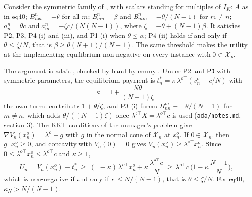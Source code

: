 \documentclass{article}
\begin{document}
\begin{claim}
Consider the symmetric family of , with scalars standing for multiples of \(I_K\): \(A\) as in eq40; \(B^n_{nm}=-\theta\) for all \(m\); \(B^n_{mn}=\beta\) and \(B^n_{mm}=-\theta/(N-1)\) for \(m\ne n\); \(a^n_n=\theta c\) and \(a^n_m=-\zeta c/(N(N-1))\), where \(\zeta=-\theta+(N-1)\beta\). It satisfies P2, P3, P4 (i) and (iii), and P1 (i) when \(\theta\le\alpha\); P4 (ii) holds if and only if \(\theta\le\zeta/N\), that is \(\beta\ge\theta(N+1)/(N-1)\). The same threshold makes the utility at the implementing equilibrium non-negative on every instance with \(0\in\mathcal{X}_n\). 
\end{claim}

The argument is ada's , checked by hand by emmy . Under P2 and P3 with symmetric parameters, the equilibrium payment is \(t^*_n=\kappa\,\lambda^{o\top}(x^o_n-c/N)\) with
\[
\kappa=1+\frac{N\theta}{(N-1)\zeta}:
\]
the own terms contribute \(1+\theta/\zeta\), and P3 (i) forces \(B^m_{nn}=-\theta/(N-1)\) for \(m\ne n\), which adds \(\theta/((N-1)\zeta)\) once \(\lambda^{o\top}X=\lambda^{o\top}c\) is used (\texttt{ada/notes.md}, section 3). The KKT conditions of the manager's problem give \(\nabla V_n(x^o_n)=\lambda^o+g\) with \(g\) in the normal cone of \(\mathcal{X}_n\) at \(x^o_n\). If \(0\in\mathcal{X}_n\), then \(g^\top x^o_n\ge0\), and concavity with \(V_n(0)=0\) gives \(V_n(x^o_n)\ge\lambda^{o\top}x^o_n\). Since \(0\le\lambda^{o\top}x^o_n\le\lambda^{o\top}c\) and \(\kappa\ge1\),
\[
U_n=V_n(x^o_n)-t^*_n\ \ge\ (1-\kappa)\,\lambda^{o\top}x^o_n+\kappa\,\frac{\lambda^{o\top}c}{N}\ \ge\ \lambda^{o\top}c\,\Big(1-\kappa\,\frac{N-1}{N}\Big),
\]
which is non-negative if and only if \(\kappa\le N/(N-1)\), that is \(\theta\le\zeta/N\). For eq40, \(\kappa_N>N/(N-1)\).
\end{document}
